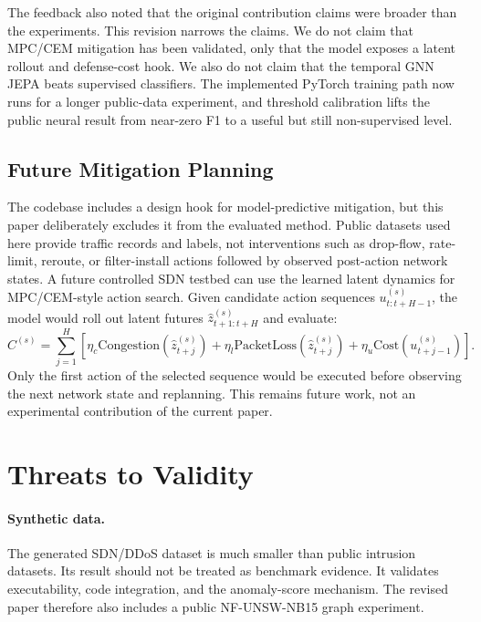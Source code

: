\documentclass[runningheads]{llncs}
\begin{document}
The feedback also noted that the original contribution claims were broader
than the experiments. This revision narrows the claims. We do not claim that
MPC/CEM mitigation has been validated, only that the model exposes a latent
rollout and defense-cost hook. We also do not claim that the temporal GNN JEPA
beats supervised classifiers. The implemented PyTorch training path now runs
for a longer public-data experiment, and threshold calibration lifts the public
neural result from near-zero F1 to a useful but still non-supervised level.

\subsection{Future Mitigation Planning}

The codebase includes a design hook for model-predictive mitigation, but this
paper deliberately excludes it from the evaluated method. Public datasets used
here provide traffic records and labels, not interventions such as drop-flow,
rate-limit, reroute, or filter-install actions followed by observed
post-action network states. A future controlled SDN testbed can use the learned
latent dynamics for MPC/CEM-style action search. Given candidate action
sequences $u_{t:t+H-1}^{(s)}$, the model would roll out latent futures
$\hat{z}_{t+1:t+H}^{(s)}$ and evaluate:
\begin{equation}
C^{(s)} =
\sum_{j=1}^{H}
\left[
\eta_c \mathrm{Congestion}(\hat{z}_{t+j}^{(s)})
+ \eta_l \mathrm{PacketLoss}(\hat{z}_{t+j}^{(s)})
+ \eta_u \mathrm{Cost}(u_{t+j-1}^{(s)})
\right].
\end{equation}
Only the first action of the selected sequence would be executed before
observing the next network state and replanning. This remains future work, not
an experimental contribution of the current paper.

\section{Threats to Validity}

\paragraph{Synthetic data.}
The generated SDN/DDoS dataset is much smaller than public intrusion datasets.
Its result should not be treated as benchmark evidence. It validates
executability, code integration, and the anomaly-score mechanism. The revised
paper therefore also includes a public NF-UNSW-NB15 graph experiment.
\end{document}

